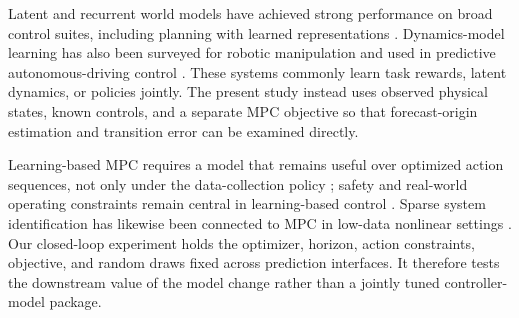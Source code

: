 Latent and recurrent world models have achieved strong performance on broad
control suites, including planning with learned representations
\cite{moerland2023_model_based_reinforcement_learning_a,hansen2023_td_mpc2_scalable_robust_world}.
Dynamics-model learning has also been surveyed for robotic manipulation and
used in predictive autonomous-driving control
\cite{ai2025_a_review_of_learning_based,gao2024_dream_to_drive_with_predictive}.
These systems commonly learn task rewards, latent dynamics, or policies
jointly. The present study instead uses observed physical states, known
controls, and a separate MPC objective so that forecast-origin estimation and
transition error can be examined directly.

Learning-based MPC requires a model that remains useful over optimized action
sequences, not only under the data-collection policy
\cite{hewing2020_learning_mpc}; safety and real-world operating constraints
remain central in learning-based control
\cite{brunke2022_safe_learning_in_robotics_from,dulac-arnold2021_challenges_of_real_world_reinforcement}.
Sparse system identification has likewise been connected to MPC in low-data
nonlinear settings \cite{kaiser2018_sindy_mpc}.
Our closed-loop experiment holds the optimizer, horizon, action constraints,
objective, and random draws fixed across prediction interfaces. It therefore
tests the downstream value of the model change rather than a jointly tuned
controller-model package.

